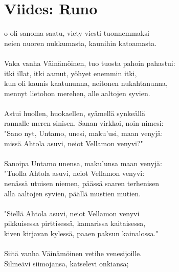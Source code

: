 
\chapter*{Viides: Runo}

o oli sanoma saatu, viety viesti tuonnemmaksi\\
neien nuoren nukkumasta, kaunihin katoamasta.            \\
                                                         \\
Vaka vanha Väinämöinen, tuo tuosta pahoin pahastui:      \\
itki illat, itki aamut, yöhyet enemmin itki,             \\
kun oli kaunis kaatununna, neitonen nukahtanunna,        \\
mennyt lietohon merehen, alle aaltojen syvien.           \\
                                                         \\
Astui huollen, huokaellen, syämellä synkeällä            \\
rannalle meren sinisen. Sanan virkkoi, noin nimesi:      \\
"Sano nyt, Untamo, unesi, maku'usi, maan venyjä:         \\
missä Ahtola asuvi, neiot Vellamon venyvi?"              \\
                                                         \\
Sanoipa Untamo unensa, maku'unsa maan venyjä:            \\
"Tuolla Ahtola asuvi, neiot Vellamon venyvi:             \\
nenässä utuisen niemen, päässä saaren terhenisen         \\
alla aaltojen syvien, päällä mustien mutien.             \\
                                                         \\
"Siellä Ahtola asuvi, neiot Vellamon venyvi              \\
pikkuisessa pirttisessä, kamarissa kaitaisessa,          \\
kiven kirjavan kylessä, paaen paksun kainalossa."        \\
                                                         \\
Siitä vanha Väinämöinen vetihe venesijoille.             \\
Silmeävi siimojansa, katselevi onkiansa;                 \\
